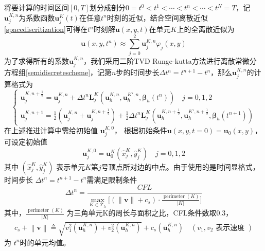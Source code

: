 \documentclass[a4paper, 12pt, UTF8]{ctexart}
\newcommand{\bs}[1]{\boldsymbol{#1}}
\begin{document}
将要计算的时间区间$[0, T]$划分成剖分$0=t^0<t^1<\cdots<t^n<\cdots<t^N=T$，记$\bs u_j^{K, n}$为系数函数$\bs u_j^K(t)$在任意$t^n$时刻的近似，结合空间离散近似\eqref{spacediscritization}可得在$t^n$时刻解$\bs u(x, y, t)$在单元$K$上的全离散近似为
\begin{equation}
\bs u(x, y, t^n)\approx \sum\limits_{j=0}^2\bs u_j^{K, n}\varphi_j(x, y)
\end{equation}
为了求得所有的系数$\bs u_j^{K, n}$，我们采用二阶TVD Runge-kutta方法进行离散常微分方程组\eqref{semidiscretescheme}，记第$n$步的时间步长$\Delta t^n=t^{n+1}-t^n$，那么$\bs u_j^{K, n}$的计算格式为
\begin{equation}
\begin{cases}
\displaystyle	   \bs u_{j}^{K,n+\frac{1}{2}}=\bs u_{j}^{K,n}+\Delta t^{n}\bs L_{j}^K\left(\bs u_{h}^{K, n}, \bs u_{h}^{K', n},\bs \beta_{h}\left(t^{n}\right)\right) \quad j=0,1,2 \\
\displaystyle	   \bs u_{j}^{K,n+1}=\frac{1}{2}\left(\bs u_{j}^{K, n}+\bs u_{j}^{K,n+\frac{1}{2}}\right)+\frac{1}{2} \Delta t^{n}\bs L_{j}^K\left(\bs u_{h}^{K, n+\frac{1}{2}}, \bs u_{h}^{K', n+\frac{1}{2}},\bs \beta_{h}\left(t^{n+1}\right)\right)
\end{cases}
\end{equation}
在上述推进计算中需给初始值 $\bs u_{j}^{K,0}$， 根据初始条件$\bs{u}(x, y, t=0)= \bs u_{0}(x, y)$，可设定初始值
\begin{equation}
\bs u_{j}^{K, 0}=\bs u_{0}^{K}\left(\hat{x}_{j}^K, \hat{y}_{j}^K\right) \quad j=0,1,2
\end{equation}
其中 $\left(\hat{x}_{j}^K, \hat{y}_{j}^K\right)$ 表示单元$K$第$j$号顶点所对边的中点。由于使用的是时间显格式，时间步长 $\Delta t^{n}=t^{n+1}-t^{n}$需满足限制条件
\begin{equation}
\displaystyle \Delta t^{n}=\frac{C F L}{\max\limits_{K \in \mathcal T_{h}}\Big[(\|\bs v\|+c_{s}) \cdot \frac{\text { perimeter }(K)}{|K|}\Big]}
\end{equation}
其中，$ \displaystyle \frac{\text { perimeter }(K)}{|K|}$ 为三角单元K的周长与面积之比，CFL条件数取0.3，
\begin{equation}
	\begin{split}
		\displaystyle c_{s}+\left\|\bs v\right\| \triangleq \sqrt{v_{1}^{2}\left(\bar{\bs u}_h^{K,n}\right)+v_{2}^{2}\left(\bar{\bs u}_h^{K,n}\right)}+c_{s}\left(\bar{\bs u}_h^{K,n}\right) \quad \left(v_{1}, v_{2}\text { 表示速度 }\right)
	\end{split}
\end{equation}
为 $t^{n}$时的单元均值。
\end{document}

